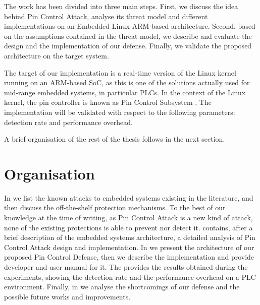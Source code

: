 The work has been divided into three main steps.
First, we discuss the idea behind Pin Control Attack, analyse its threat model and different implementations on an Embedded Linux ARM-based architecture.
Second, based on the assumptions contained in the threat model, we describe and evaluate the design and the implementation of our defense.
Finally, we validate the proposed architecture on the target system.

The target of our implementation is a real-time version of the Linux kernel running on an ARM-based SoC,
as this is one of the solutions actually used for mid-range embedded systems, in particular PLCs.
In the context of the Linux kernel, the pin controller is known as Pin Control Subsystem \cite{pinctrl}.
The implementation will be validated with respect to the following parameters: detection rate and performance overhead.

A brief organisation of the rest of the thesis follows in the next section.


\section{Organisation}

In  we list the known attacks to embedded systems existing in the literature, and then discuss the off-the-shelf protection mechanisms.
To the best of our knowledge at the time of writing, as Pin Control Attack is a new kind of attack, none of the existing protections is able to prevent nor detect it.
 contains, after a brief description of the embedded systems architecture, a detailed analysis of Pin Control Attack design and implementation.
In  we present the architecture of our proposed Pin Control Defense, then we describe the implementation and provide developer and user manual for it.
The  provides the results obtained during the experiments, showing the detection rate and the performance overhead on a PLC environment.
Finally, in  we analyse the shortcomings of our defense and the possible future works and improvements.
